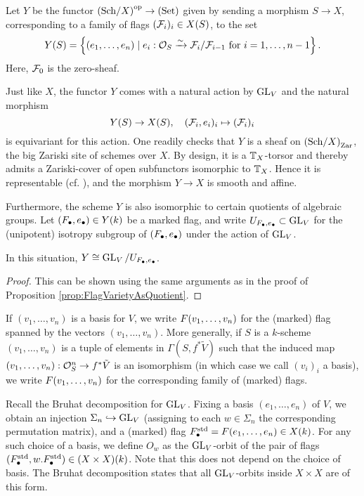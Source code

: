 \documentclass[../main.tex]{subfiles}
\begin{document}
\begin{defi}\label{def:MarkedFlagVar}
  Let $Y$ be the functor ${(\mathrm{Sch}/{X})}^{\mathrm{op}} \to {(\mathrm{Set})}$ given by sending a morphism
  $S \to X$, corresponding to a family of flags $(\mathcal{F}_i)_i \in X(S)$, to the set
  \begin{equation*}
    Y(S) = \left\{(e_1, \dots, e_n) \mid e_i: \mathcal{O}_S \xrightarrow{\sim} 
    \mathcal{F}_i/\mathcal{F}_{i-1}\text{ for } i = 1, \dots, n-1\right \}.
  \end{equation*}
  Here, $\mathcal{F}_0$ is the zero-sheaf.
\end{defi}
Just like $X$, the functor $Y$ comes with a natural action by $\operatorname{GL}_V$
and the natural morphism
\begin{equation}\label{eq:naturalmapYtoX}
  Y(S) \to X(S), \quad (\mathcal{F}_i, e_i)_i \mapsto (\mathcal{F}_i)_i
\end{equation}
is equivariant for this action. One readily checks that $Y$ is a sheaf on
${(\mathrm{Sch}/{X})}_{\mathrm{Zar}}$, the big Zariski site of schemes over $X$. 
By design, it is a $\mathbb{T}_X$-torsor and thereby admits a Zariski-cover of open
subfunctors isomorphic to $\mathbb{T}_X$. Hence it is representable (cf. \cite[Theorem
8.9]{gortz2020algebraic}), and the morphism $Y \to X$ is smooth and affine.

Furthermore, the scheme $Y$ is also isomorphic to certain quotients of
algebraic groups.
Let $(F_\bullet,e_\bullet) \in Y(k)$ be a marked flag, and write 
$U_{F_\bullet, e_\bullet} \subset \operatorname{GL}_V$ for the (unipotent) isotropy subgroup of
$(F_\bullet, e_\bullet)$ under the action of $\operatorname{GL}_V$. 
\begin{lem}\label{lem:MarkedFlagVarietyAsQuotient}
  In this situation, $Y \cong \operatorname{GL}_V/U_{F_\bullet, e_\bullet}$.
\begin{proof}
  This can be shown using the same arguments as in the proof of
  Proposition \ref{prop:FlagVarietyAsQuotient}.
\end{proof}
\end{lem}

If $(v_1, \dots, v_n)$ is a basis for $V$, we write $F(v_1, \dots, v_n)$ for
the (marked) flag spanned by the vectors $(v_1, \dots, v_n)$. 
More generally, if $S$ is a $k$-scheme $(v_1, \dots, v_n)$ is a tuple of elements 
in $\Gamma(S, f^*\tilde V)$ such that the induced map $(v_1, \dots, v_n): \mathcal{O}_S^n \to 
f^* \tilde V$ is an isomorphism (in which case we call $(v_i)_i$ a basis), we
write $F(v_1, \dots, v_n)$ for the corresponding family of (marked) flags.

Recall the Bruhat decomposition for $\operatorname{GL}_V$.
Fixing a basis $(e_1, \dots, e_n)$ of $V$, we obtain an injection
$\Sigma_n \hookrightarrow \operatorname{GL}_V$ (assigning to each $w \in \Sigma_n$ the corresponding
permutation matrix), and a (marked) flag $F_\bullet^{\mathrm{std}} = F(e_1, \dots, e_n) \in
X(k)$.  For any such choice of a basis, we define $O_w$ as the $\operatorname{GL}_V$-orbit
of the pair of flags $(F_\bullet^{\mathrm{std}}, w.F_\bullet^{\mathrm{std}}) \in (X \times X)(k)$.
Note that this does not depend on the choice of basis.
The Bruhat decomposition states that all $\operatorname{GL}_V$-orbits inside $X \times X$ are of 
this form.
\end{document}
